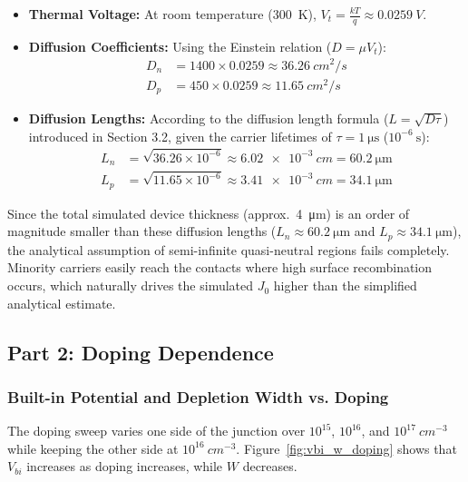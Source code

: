 \documentclass[11pt,a4paper]{article}
\newcommand{\jzero}{J_0}
\newcommand{\vbi}{V_{bi}}
\newcommand{\um}{\si{\micro\meter}}
\begin{document}
\begin{itemize}
    \item \textbf{Thermal Voltage:} At room temperature (\SI{300}{K}), $V_t = \frac{kT}{q} \approx \SI{0.0259}{V}$.
    \item \textbf{Diffusion Coefficients:} Using the Einstein relation ($D = \mu V_t$):
    \begin{align*}
        D_n &= 1400 \times 0.0259 \approx \SI{36.26}{cm^2/s} \\
        D_p &= 450 \times 0.0259 \approx \SI{11.65}{cm^2/s}
    \end{align*}
    \item \textbf{Diffusion Lengths:} According to the diffusion length formula ($L = \sqrt{D\tau}$) introduced in Section 3.2, given the carrier lifetimes of $\tau = \SI{1}{\micro\second}$ ($10^{-6}\ \mathrm{s}$):
    \begin{align*}
        L_n &= \sqrt{36.26 \times 10^{-6}} \approx \SI{6.02e-3}{cm} = \SI{60.2}{\micro\meter} \\
        L_p &= \sqrt{11.65 \times 10^{-6}} \approx \SI{3.41e-3}{cm} = \SI{34.1}{\micro\meter}
    \end{align*}
\end{itemize}

Since the total simulated device thickness (approx.\ \SI{4}{\um}) is an order of magnitude smaller than these diffusion lengths ($L_n \approx \SI{60.2}{\um}$ and $L_p \approx \SI{34.1}{\um}$), the analytical assumption of semi-infinite quasi-neutral regions fails completely. Minority carriers easily reach the contacts where high surface recombination occurs, which naturally drives the simulated $\jzero$ higher than the simplified analytical estimate.

\subsection{Part 2: Doping Dependence}

\subsubsection{Built-in Potential and Depletion Width vs. Doping}

The doping sweep varies one side of the junction over $10^{15}$, $10^{16}$, and $10^{17}\ \si{cm^{-3}}$ while keeping the other side at $10^{16}\ \si{cm^{-3}}$. Figure~\ref{fig:vbi_w_doping} shows that $\vbi$ increases as doping increases, while $W$ decreases.
\end{document}
